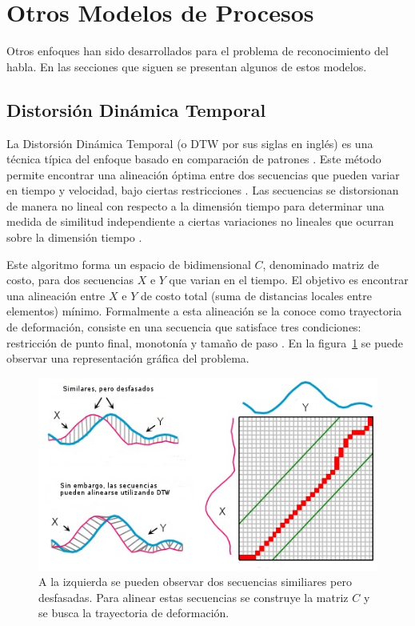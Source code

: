 \section{Otros Modelos de Procesos}
\label{sec:otrosModelos}

Otros enfoques han sido desarrollados para el problema de reconocimiento del habla. En las secciones que siguen
se presentan algunos de estos modelos.

\subsection{Distorsi\'on Din\'amica Temporal}
\label{sec:dtw}

La Distorsi\'on Din\'amica Temporal (o DTW por sus siglas en ingl\'es) es una t\'ecnica t\'ipica del enfoque
basado en comparaci\'on de patrones \cite{GaikwadAReview2010}. Este m\'etodo permite encontrar una alineaci\'on \'optima 
entre dos secuencias que pueden variar en tiempo y velocidad, bajo ciertas restricciones \cite{MullerInformation2007}.
Las secuencias se distorsionan de manera no lineal con respecto a la dimensi\'on tiempo para determinar una medida
de similitud independiente a ciertas variaciones no lineales que ocurran sobre la dimensi\'on tiempo \cite{AnusuyaSpeech2009}.

Este algoritmo forma un espacio de bidimensional $C$, denominado matriz de costo, para dos secuencias $X$ e $Y$ que varian en 
el tiempo. El objetivo es encontrar
una alineaci\'on entre $X$ e $Y$ de costo total (suma de distancias locales entre elementos) m\'inimo. 
Formalmente a esta alineaci\'on se la conoce como trayectoria de
deformaci\'on, consiste en una secuencia que satisface tres condiciones: restricci\'on de punto final, 
monoton\'ia y tama\~no de paso \cite{MullerInformation2007}. En la figura~\ref{figure:dtw} se puede observar
una representaci\'on gr\'afica del problema.

\begin{figure}[H]
\centering
\includegraphics[width=0.9\linewidth]{./graphics/dtw.png}
\caption{A la izquierda se pueden observar dos secuencias similiares pero desfasadas. Para alinear estas secuencias
se construye la matriz $C$ y se busca la trayectoria de deformaci\'on.}
\label{figure:dtw}
\end{figure}

